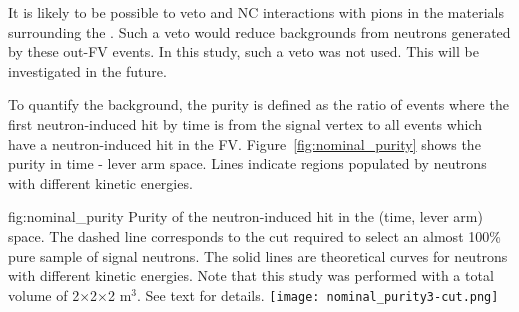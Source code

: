 It is likely to be possible to veto   and NC interactions with pions in the materials surrounding the .  Such a veto would reduce backgrounds from neutrons generated by these out-FV events.  In this study, such a veto was not used. This will be investigated in the future.

To quantify the background, the purity is defined as the ratio of events where the first neutron-induced hit by time is from the signal vertex to all events which have a neutron-induced hit in the FV. 
Figure~\ref{fig:nominal_purity} shows the purity in time - lever arm space. Lines indicate regions populated by neutrons with different kinetic energies.
\begin{dunefigure}{fig:nominal_purity}
{Purity of the neutron-induced hit in the (time, lever arm) space.
The dashed line corresponds to the cut required to select an almost 100\% pure sample of signal neutrons. The solid lines are theoretical curves for neutrons with different kinetic energies.
Note that this study was performed with a total volume of 2$\times$2$\times$2 m$^3$.
See text for details.}
  \texttt{[image: nominal\_purity3-cut.png]}
\end{dunefigure}

